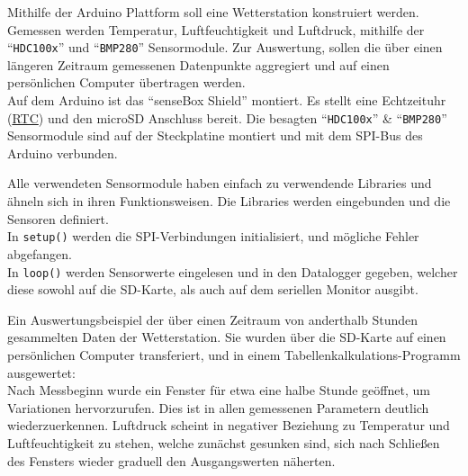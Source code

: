 \documentclass[ngerman]{handout}
\begin{document}
\begin{multicols*}{2}
    

    Mithilfe der Arduino Plattform soll eine Wetterstation konstruiert werden. Gemessen werden Temperatur, Luftfeuchtigkeit und Luftdruck, mithilfe der \enquote{\texttt{HDC100x}} und \enquote{\texttt{BMP280}} Sensormodule.
    Zur Auswertung, sollen die über einen längeren Zeitraum gemessenen Datenpunkte aggregiert und auf einen persönlichen Computer übertragen werden\cite{EnergyLab-Wettermessstation}.\\

    Auf dem Arduino ist das \enquote{senseBox Shield} montiert.
    Es stellt eine Echtzeituhr (\href{https://de.wikipedia.org/wiki/Echtzeituhr}{RTC}) und den microSD Anschluss bereit.
    Die besagten \enquote{\texttt{HDC100x}} \& \enquote{\texttt{BMP280}} Sensormodule sind auf der Steckplatine montiert und mit dem SPI-Bus des Arduino verbunden.

    Alle verwendeten Sensormodule haben einfach zu verwendende Libraries und ähneln sich in ihren Funktionsweisen.
    Die Libraries werden eingebunden und die Sensoren definiert.\\

    In \texttt{setup()} werden die SPI-Verbindungen initialisiert, und mögliche Fehler abgefangen.\\

    In \texttt{loop()} werden Sensorwerte eingelesen und in den Datalogger gegeben, welcher diese sowohl auf die SD-Karte, als auch auf dem seriellen Monitor ausgibt.

    Ein Auswertungsbeispiel der über einen Zeitraum von anderthalb Stunden gesammelten Daten der Wetterstation.
    Sie wurden über die SD-Karte auf einen persönlichen Computer transferiert, und in einem Tabellenkalkulations-Programm ausgewertet:\\

    Nach Messbeginn wurde ein Fenster für etwa eine halbe Stunde geöffnet, um Variationen hervorzurufen.
    Dies ist in allen gemessenen Parametern deutlich wiederzuerkennen.
    Luftdruck scheint in negativer Beziehung zu Temperatur und Luftfeuchtigkeit zu stehen, welche zunächst gesunken sind, sich nach Schließen des Fensters wieder graduell den Ausgangswerten näherten.
    

\end{multicols*}
\end{document}
